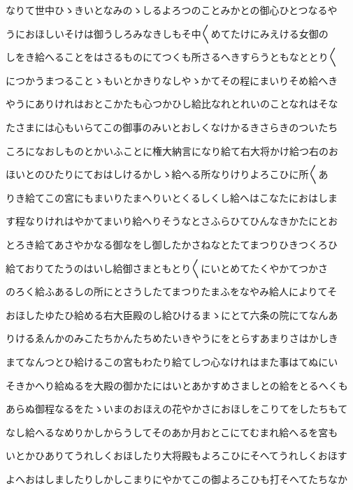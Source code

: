 \documentclass[a4paper,11pt,landscape]{ltjtarticle}
\begin{document}
\par\medskip
なりて世中ひゝきいとなみのゝしるよろつのことみかとの御心ひとつなるや
\par\medskip
うにおほしいそけは御うしろみなきしもそ中〱めてたけにみえける女御の
\par\medskip
しをき給へることをはさるものにてつくも所さるへきすらうともなととり〱
\par\medskip
につかうまつることゝもいとかきりなしやゝかてその程にまいりそめ給へき
\par\medskip
やうにありけれはおとこかたも心つかひし給比なれとれいのことなれはそな
\par\medskip
たさまには心もいらてこの御事のみいとおしくなけかるきさらきのついたち
\par\medskip
ころになおしものとかいふことに権大納言になり給て右大将かけ給つ右のお
\par\medskip
ほいとのひたりにておはしけるかしゝ給へる所なりけりよろこひに所〱あ
\par\medskip
りき給てこの宮にもまいりたまへりいとくるしくし給へはこなたにおはしま
\par\medskip
す程なりけれはやかてまいり給へりそうなとさふらひてひんなきかたにとお
\par\medskip
とろき給てあさやかなる御なをし御したかさねなとたてまつりひきつくろひ
\par\medskip
給ておりてたうのはいし給御さまともとり〱にいとめてたくやかてつかさ
\par\medskip
のろく給ふあるしの所にとさうしたてまつりたまふをなやみ給人によりてそ
\par\medskip
おほしたゆたひ給める右大臣殿のし給ひけるまゝにとて六条の院にてなんあ
\par\medskip
りけるゑんかのみこたちかんたちめたいきやうにをとらすあまりさはかしき
\par\medskip
まてなんつとひ給けるこの宮もわたり給てしつ心なけれはまた事はてぬにい
\par\medskip
そきかへり給ぬるを大殿の御かたにはいとあかすめさましとの給をとるへくも
\par\medskip
あらぬ御程なるをたゝいまのおほえの花やかさにおほしをこりてをしたちもて
\par\medskip
なし給へるなめりかしからうしてそのあか月おとこにてむまれ給へるを宮も
\par\medskip
いとかひありてうれしくおほしたり大将殿もよろこひにそへてうれしくおほす
\par\medskip
よへおはしましたりしかしこまりにやかてこの御よろこひも打そへてたちなか
\par\medskip
\end{document}
